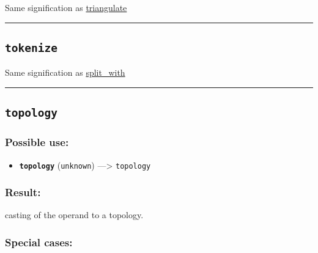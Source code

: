 \documentclass[]{book}
\providecommand{\tightlist}{%
  \setlength{\itemsep}{0pt}\setlength{\parskip}{0pt}}
\theoremstyle{definition}
\theoremstyle{definition}
\theoremstyle{definition}
\theoremstyle{remark}
\begin{document}
Same signification as
\href{operators-s-to-z.html\#triangulate}{triangulate}

\begin{center}\rule{0.5\linewidth}{\linethickness}\end{center}

\subsection{\texorpdfstring{\texttt{tokenize}}{tokenize}}\label{tokenize}

Same signification as
\href{operators-s-to-z.html\#split_with}{split\_with}

\begin{center}\rule{0.5\linewidth}{\linethickness}\end{center}

\subsection{\texorpdfstring{\texttt{topology}}{topology}}\label{topology}

\subsubsection{Possible use:}\label{possible-use-525}

\begin{itemize}
\tightlist
\item
  \textbf{\texttt{topology}} (\texttt{unknown}) ---\textgreater{}
  \texttt{topology}
\end{itemize}

\subsubsection{Result:}\label{result-507}

casting of the operand to a topology.

\subsubsection{Special cases:}\label{special-cases-138}
\end{document}
